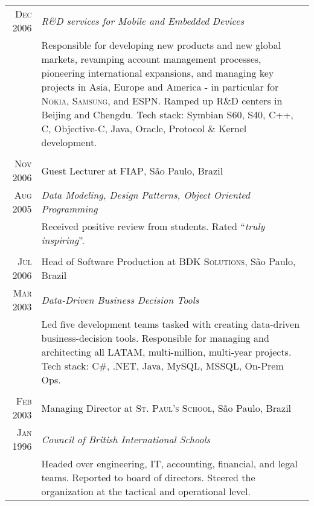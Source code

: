 \documentclass[a4paper,10pt]{article}
\begin{document}
\begin{tabular}{r|p{11cm}}
  \textsc{Dec 2006} & \emph{R\&D services for Mobile and Embedded Devices} \\

  &\footnotesize{Responsible for developing new products and new
    global markets, revamping account management processes, pioneering
    international expansions, and managing key projects in Asia,
    Europe and America - in particular for \textsc{Nokia},
    \textsc{Samsung}, and \textsc{ESPN}. Ramped up R\&D centers in
    Beijing and Chengdu. Tech stack: Symbian S60, S40, C++, C,
    Objective-C, Java, Oracle, Protocol \& Kernel development.}\\

  \multicolumn{2}{c}{}\\

  \textsc{Nov 2006} & Guest Lecturer at \textsc{FIAP}, S\~{a}o Paulo, Brazil \\

  \textsc{Aug 2005} & \emph{Data Modeling, Design Patterns, Object Oriented
    Programming} \\

  &\footnotesize{Received positive review from students. Rated ``\emph{truly
      inspiring}''.}\\

  \multicolumn{2}{c}{}\\

  \textsc{Jul 2006} & Head of Software Production at \textsc{BDK Solutions},
  S\~{a}o Paulo, Brazil \\

  \textsc{Mar 2003} & \emph{Data-Driven Business Decision Tools} \\

  &\footnotesize{Led five development teams tasked with creating
    data-driven business-decision tools. Responsible for managing and
    architecting all LATAM, multi-million, multi-year projects. Tech
    stack: C\#, .NET, Java, MySQL, MSSQL, On-Prem Ops.}\\

  \multicolumn{2}{c}{}\\

  \textsc{Feb 2003} & Managing Director at \textsc{St. Paul's School}, S\~{a}o
  Paulo, Brazil \\

  \textsc{Jan 1996} & \emph{Council of British International Schools} \\

  &\footnotesize{Headed over engineering, IT, accounting, financial, and legal
    teams. Reported to board of directors. Steered the organization at the
    tactical and operational level.}\\

\end{tabular}
\end{document}
